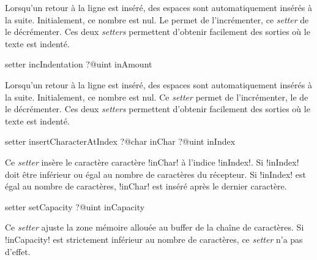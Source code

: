 Lorsqu'un retour à la ligne est inséré, des espaces sont automatiquement insérés à la suite. Initialement, ce nombre est nul. Le  permet de l'incrémenter, ce \emph{setter} de le décrémenter. Ces deux \emph{setters} permettent d'obtenir facilement des sorties où le texte est indenté.






\begin{galgasbox}
setter incIndentation ?@uint inAmount
\end{galgasbox}

Lorsqu'un retour à la ligne est inséré, des espaces sont automatiquement insérés à la suite. Initialement, ce nombre est nul. Ce \emph{setter} permet de l'incrémenter, le  de le décrémenter. Ces deux \emph{setters} permettent d'obtenir facilement des sorties où le texte est indenté.









\begin{galgasbox}
setter insertCharacterAtIndex
   ?@char inChar
   ?@uint inIndex
\end{galgasbox}


Ce \emph{setter} insère le caractère caractère \ggs!inChar! à l'indice \ggs!inIndex!. Si \ggs!inIndex! doit être inférieur ou égal au nombre de caractères du récepteur. Si \ggs!inIndex! est égal au nombre de caractères, \ggs!inChar! est inséré après le dernier caractère. 









\begin{galgasbox}
setter setCapacity ?@uint inCapacity
\end{galgasbox}


Ce \emph{setter} ajuste la zone mémoire allouée au buffer de la chaîne de caractères. Si \ggs!inCapacity! est strictement inférieur au nombre de caractères, ce \emph{setter} n'a pas d'effet.







